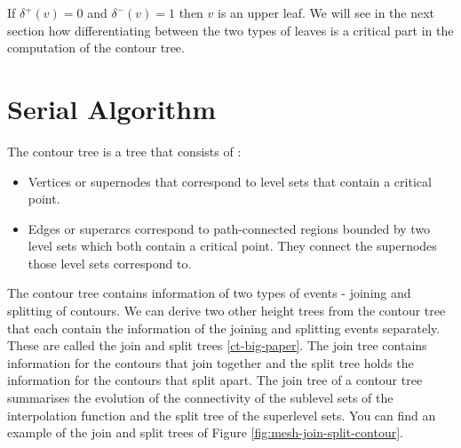 If $\delta^+(v) = 0$ and $\delta^-(v) = 1$ then $v$ is an upper leaf. We will see in the next section how differentiating between the two types of leaves is a critical part in the computation of the contour tree.

\section{Serial Algorithm}

The contour tree is a tree that consists of \cite{first-ct-algo}:

\begin{itemize}
    \item Vertices or supernodes that correspond to level sets that contain a critical point.
    \item Edges or superarcs correspond to path-connected regions bounded by two level sets which both contain a critical point. They connect the supernodes those level sets correspond to.
\end{itemize}

The contour tree contains information of two types of events - joining and splitting of contours. We can derive two other height trees from the contour tree that each contain the information of the joining and splitting events separately. These are called the join and split trees \ref{ct-big-paper}. The join tree contains information for the contours that join together and the split tree holds the information for the contours that split apart. The join tree of a contour tree summarises the evolution of the connectivity of the sublevel sets of the interpolation function and the split tree of the superlevel sets. You can find an example of the join and split trees of Figure \ref{fig:mesh-join-split-contour}.



